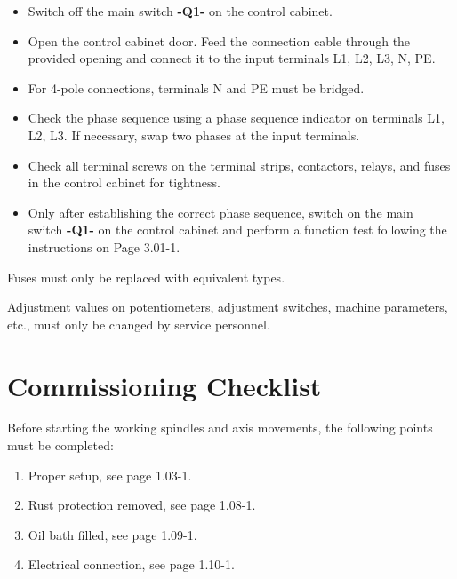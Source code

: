 \begin{itemize}
    \item Switch off the main switch \textbf{-Q1-} on the control cabinet.
    \item Open the control cabinet door. Feed the connection cable through the \\provided opening and connect it to the input terminals L1, L2, L3, N, PE.
    \item For 4-pole connections, terminals N and PE must be bridged.
    \item Check the phase sequence using a phase sequence indicator on terminals L1, L2, L3. If necessary, swap two phases at the input terminals.
    \item Check all terminal screws on the terminal strips, contactors, relays, and fuses in the control cabinet for tightness.
    \item Only after establishing the correct phase sequence, switch on the main \\switch \textbf{-Q1-} on the control cabinet and perform a function test following the instructions on Page 3.01-1.
\end{itemize}




\noindent Fuses must only be replaced with equivalent types.

\vspace{.5cm}

\noindent Adjustment values on potentiometers, adjustment switches, machine parameters, etc., must only be changed by service personnel.

\section*{Commissioning Checklist}

Before starting the working spindles and axis movements, the following points must be completed:

\begin{enumerate}
    \item Proper setup, see page 1.03-1.
    \item Rust protection removed, see page 1.08-1.
    \item Oil bath filled, see page 1.09-1.
    \item Electrical connection, see page 1.10-1.
\end{enumerate}